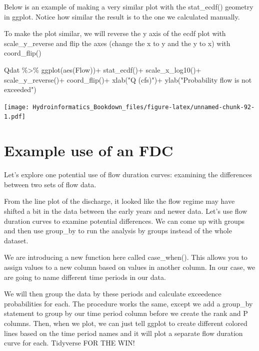 \documentclass[
]{book}
\newenvironment{Shaded}{\begin{snugshade}}{\end{snugshade}}
\newcommand{\FunctionTok}[1]{\textcolor[rgb]{0.00,0.00,0.00}{#1}}
\newcommand{\NormalTok}[1]{#1}
\newcommand{\SpecialCharTok}[1]{\textcolor[rgb]{0.00,0.00,0.00}{#1}}
\newcommand{\StringTok}[1]{\textcolor[rgb]{0.31,0.60,0.02}{#1}}
\begin{document}
Below is an example of making a very similar plot with the stat\_ecdf() geometry in ggplot. Notice how similar the result is to the one we calculated manually.

To make the plot similar, we will reverse the y axis of the ecdf plot with scale\_y\_reverse and flip the axes (change the x to y and the y to x) with coord\_flip()

\begin{Shaded}
\begin{Highlighting}[]
\NormalTok{Qdat }\SpecialCharTok{\%\textgreater{}\%} \FunctionTok{ggplot}\NormalTok{(}\FunctionTok{aes}\NormalTok{(Flow))}\SpecialCharTok{+}
  \FunctionTok{stat\_ecdf}\NormalTok{()}\SpecialCharTok{+}
  \FunctionTok{scale\_x\_log10}\NormalTok{()}\SpecialCharTok{+}
  \FunctionTok{scale\_y\_reverse}\NormalTok{()}\SpecialCharTok{+}
  \FunctionTok{coord\_flip}\NormalTok{()}\SpecialCharTok{+}
  \FunctionTok{xlab}\NormalTok{(}\StringTok{"Q (cfs)"}\NormalTok{)}\SpecialCharTok{+}
  \FunctionTok{ylab}\NormalTok{(}\StringTok{"Probability flow is not exceeded"}\NormalTok{)}
\end{Highlighting}
\end{Shaded}

\texttt{[image: Hydroinformatics\_Bookdown\_files/figure-latex/unnamed-chunk-92-1.pdf]}

\hypertarget{example-use-of-an-fdc}{%
\section{Example use of an FDC}\label{example-use-of-an-fdc}}

Let's explore one potential use of flow duration curves: examining the differences between two sets of flow data.

From the line plot of the discharge, it looked like the flow regime may have shifted a bit in the data between the early years and newer data. Let's use flow duration curves to examine potential differences. We can come up with groups and then use group\_by to run the analysis by groups instead of the whole dataset.

We are introducing a new function here called case\_when(). This allows you to assign values to a new column based on values in another column. In our case, we are going to name different time periods in our data.

We will then group the data by these periods and calculate exceedence probabilities for each. The procedure works the same, except we add a group\_by statement to group by our time period column before we create the rank and P columns. Then, when we plot, we can just tell ggplot to create different colored lines based on the time period names and it will plot a separate flow duration curve for each. Tidyverse FOR THE WIN!
\end{document}
